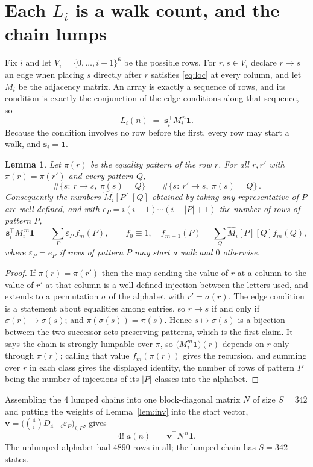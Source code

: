 \documentclass[11pt,a4paper]{article}
\theoremstyle{plain}
\newtheorem{lemma}[theorem]{Lemma}
\theoremstyle{definition}
\begin{document}
\section{Each $L_i$ is a walk count, and the chain lumps}

Fix $i$ and let $V_i=\{0,\dots,i-1\}^{6}$ be the possible rows. For $r,s\in V_i$
declare $r\to s$ an edge when placing $s$ directly after $r$ satisfies \eqref{eq:loc} at
every column, and let $M_i$ be the adjacency matrix. An array is exactly a sequence of
rows, and its condition is exactly the conjunction of the edge conditions along that
sequence, so
\[
L_i(n)\;=\;\mathbf{s}_i^{\!\top}M_i^{\,n}\mathbf{1} .
\]
Because the condition involves no row before the first, every
row may start a walk, and $\mathbf{s}_i=\mathbf{1}$.

\begin{lemma}\label{lem:lump}
Let $\pi(r)$ be the equality pattern of the row $r$. For all $r,r'$ with
$\pi(r)=\pi(r')$ and every pattern $Q$,
\[
\#\{s:\ r\to s,\ \pi(s)=Q\}\;=\;\#\{s:\ r'\to s,\ \pi(s)=Q\}\, .
\]
Consequently the numbers $\widehat M_i[P][Q]$ obtained by taking any representative of $P$
are well defined, and with $e_P=i(i-1)\cdots(i-|P|+1)$ the number of rows of pattern $P$,
\[
\mathbf{s}_i^{\!\top}M_i^{\,m}\mathbf{1}\;=\;\sum_P \varepsilon_P\,f_m(P),
\qquad f_0\equiv1,\quad f_{m+1}(P)=\sum_Q\widehat M_i[P][Q]f_m(Q),
\]
where $\varepsilon_P=e_P$ if rows of pattern $P$ may start a walk and $0$ otherwise.
\end{lemma}

\begin{proof}
If $\pi(r)=\pi(r')$ then the map sending the value of $r$ at a column to the value of $r'$
at that column is a well-defined injection between the letters used, and extends to a
permutation $\sigma$ of the alphabet with $r'=\sigma(r)$. The edge condition is a statement
about equalities among entries, so $r\to s$ if and only if $\sigma(r)\to\sigma(s)$; and
$\pi(\sigma(s))=\pi(s)$. Hence $s\mapsto\sigma(s)$ is a bijection between the two successor
sets preserving patterns, which is the first claim. It says the chain is strongly lumpable
over $\pi$, so $\bigl(M_i^{m}\mathbf{1}\bigr)(r)$ depends on $r$ only through $\pi(r)$;
calling that value $f_m(\pi(r))$ gives the recursion, and summing over $r$ in each class
gives the displayed identity, the number of rows of pattern $P$ being the number of
injections of its $|P|$ classes into the alphabet.
\end{proof}

Assembling the $4$ lumped chains into one block-diagonal matrix $N$ of size $S=342$ and
putting the weights of Lemma~\ref{lem:inv} into the start vector,
$\mathbf{v}=\bigl(\binom{4}{i}D_{4-i}\varepsilon_P\bigr)_{i,P}$, gives
\begin{equation}\label{eq:walk}
4!\;a(n)\;=\;\mathbf{v}^{\!\top}N^{\,n}\mathbf{1} .
\end{equation}
The unlumped alphabet had $4890$ rows in all; the lumped chain has $S=342$ states.
\end{document}
